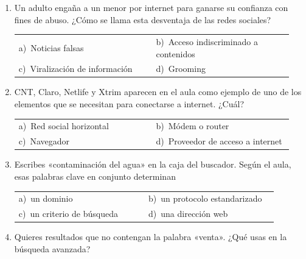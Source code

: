 \documentclass[11pt,a4paper]{article}
\begin{document}
\begin{enumerate}[label=\textbf{\arabic*.},leftmargin=*,itemsep=6pt,topsep=0pt]
\item \begin{minipage}[t]{\linewidth}
Un adulto engaña a un menor por internet para ganarse su confianza con fines de abuso. ¿Cómo se llama esta desventaja de las redes sociales?

\vspace{4pt}
\begin{tabular}{@{}>{\raggedright\arraybackslash}p{0.47\linewidth}>{\raggedright\arraybackslash}p{0.47\linewidth}@{}}
a)~Noticias falsas & b)~Acceso indiscriminado a contenidos \\
c)~Viralización de información & d)~Grooming \\
\end{tabular}
\end{minipage}

\item \begin{minipage}[t]{\linewidth}
CNT, Claro, Netlife y Xtrim aparecen en el aula como ejemplo de uno de los elementos que se necesitan para conectarse a internet. ¿Cuál?

\vspace{4pt}
\begin{tabular}{@{}>{\raggedright\arraybackslash}p{0.47\linewidth}>{\raggedright\arraybackslash}p{0.47\linewidth}@{}}
a)~Red social horizontal & b)~Módem o router \\
c)~Navegador & d)~Proveedor de acceso a internet \\
\end{tabular}
\end{minipage}

\item \begin{minipage}[t]{\linewidth}
Escribes «contaminación del agua» en la caja del buscador. Según el aula, esas palabras clave en conjunto determinan

\vspace{4pt}
\begin{tabular}{@{}>{\raggedright\arraybackslash}p{0.47\linewidth}>{\raggedright\arraybackslash}p{0.47\linewidth}@{}}
a)~un dominio & b)~un protocolo estandarizado \\
c)~un criterio de búsqueda & d)~una dirección web \\
\end{tabular}
\end{minipage}

\item \begin{minipage}[t]{\linewidth}
Quieres resultados que no contengan la palabra «venta». ¿Qué usas en la búsqueda avanzada?


\end{minipage}
\end{enumerate}
\end{document}
